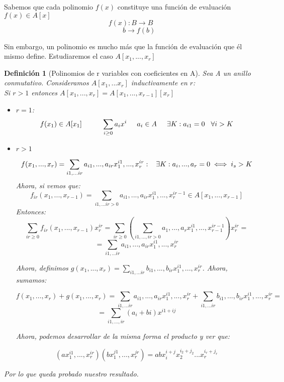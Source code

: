 \documentclass[11pt, a4paper, titlepage]{article}
\makeatletter
\renewenvironment{proof}[1][\proofname] {\vspace{-15pt}\par\pushQED{\qed}\normalfont\topsep6\p@\@plus6\p@\relax\trivlist\item[\hskip\labelsep\it#1\@addpunct{.}]\ignorespaces}{\popQED\endtrivlist\@endpefalse}
\theoremstyle{theorem-style}
\theoremstyle{definition-style}
\newtheorem*{ndef}{Definición}
\theoremstyle{remark-style}
\theoremstyle{example-style}
\makeatother
\begin{document}
Sabemos que cada polinomio $f(x)$ constituye una función de evaluación $f(x) \in A[x]$
\[
f(x):B \to B
\]
\[
\hspace{1cm}b \to f(b)
\]

Sin embargo, un polinomio es mucho más que la función de evaluación que él mismo define. Estudiaremos el caso $A[x_1,...,x_r]$

\begin{ndef}[Polinomios de r variables con coeficientes en A]
Sea A un anillo conmutativo. Consideramos $A[x_1,...x_r]$ inductivamente en $r$:\\
Si $r>1$ entonces $A[x_1,...,x_r] = A[x_1,...,x_{r-1}][x_r]$\\
	
\begin{proof}\hfill 

\begin{itemize}

	\item $r=1$:
\[
f(x_1) \in A[x_1] \hspace{1cm} \sum_{i \geq 0}a_i x^i \hspace{0.5cm} a_i \in A \hspace{0.5cm} \exists K: a_{i1} = 0 \hspace{0.3cm} \forall i > K
\]
	\item $r> 1$

\[
f(x_1,...,x_r) = \sum_{i1,...ir} a_{i1},...,a_{ir} x_1^{i1},...,x_r^{ir}: \hspace{0.3cm} \exists K: a_i,...,a_r  = 0 \iff i_s > K
\]
Ahora, si vemos que:
\[
f_{ir}(x_1,...,x_{r-1}) = \sum_{i1,...ir > 0} a_{i1},...,a_{ir} x_1^{i1},...,x_r^{ir-1} \in A[x_1,...,x_{r-1}]
\]
Entonces:
\[
\sum_{ir \geq 0} f_{ir}(x_1,...,x_{r-1})x_r^{ir}= \sum_{ir \geq 0}(\sum_{i1,...,ir > 0}a_1,...,a_r x_1^{i1},...,x_{r-1}^{ir-1})x_r^{ir} = 
\]
\[
=\sum_{i1,...ir} a_{i1},...,a_{ir} x_1^{i1},...,x_r^{ir}
\]
\newpage

Ahora, definimos $g(x_1,...,x_r) = \sum_{i1,...ir} b_{i1},...,b_{ir} x_1^{i1},...,x_r^{ir}$. Ahora, sumamos:

\[
f(x_1,...,x_r)+g(x_1,...,x_r) = \sum_{i1,...ir} a_{i1},...,a_{ir} x_1^{i1},...,x_r^{ir} + \sum_{i1,...ir} b_{i1},...,b_{ir} x_1^{i1},...,x_r^{ir} = 
\]
\[
 = \sum_{i1,...,ir} (a_i+bi)x^{i1+ij}
\]

Ahora, podemos desarrollar de la misma forma el producto y ver que:

\[
(ax_1^{i1},...,x_r^{ir})(bx_1^{j1},...,x_r^{jr}) = abx_i^{i+j}x_2^{i_2+j_2}...x_r^{i_r+j_r}
\]

\end{itemize}
Por lo que queda probado nuestro resultado.
\end{proof}

\end{ndef}
\end{document}
